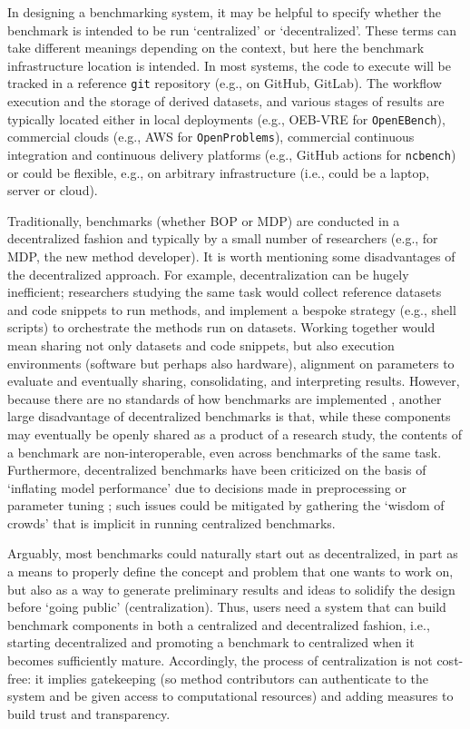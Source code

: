 \documentclass[11pt]{article}
\begin{document}
In designing a benchmarking system, it may be helpful to specify whether the benchmark is intended to be run `centralized' or `decentralized'. These terms can take different meanings depending on the context, but here the benchmark infrastructure location is intended. In most systems, the code to execute will be tracked in a reference \texttt{git} repository (e.g., on GitHub, GitLab). The workflow execution and the storage of derived datasets, and various stages of results are typically located either in local deployments (e.g., OEB-VRE for \texttt{OpenEBench}), commercial clouds (e.g., AWS for \texttt{OpenProblems}), commercial continuous integration and continuous delivery platforms (e.g., GitHub actions for \texttt{ncbench}) or could be flexible, e.g., on arbitrary infrastructure (i.e., could be a laptop, server or cloud). 

Traditionally, benchmarks (whether BOP or MDP) are conducted in a decentralized fashion and typically by a small number of researchers (e.g., for MDP, the new method developer). It is worth mentioning some disadvantages of the decentralized approach. For example, decentralization can be hugely inefficient; researchers studying the same task would collect reference datasets and code snippets to run methods, and implement a bespoke strategy (e.g., shell scripts) to orchestrate the methods run on datasets. Working together would mean sharing not only datasets and code snippets, but also execution environments (software but perhaps also hardware), alignment on parameters to evaluate and eventually sharing, consolidating, and interpreting results. However, because there are no standards of how benchmarks are implemented \cite{Sonrel2023-te}, another large disadvantage of decentralized benchmarks is that, while these components may eventually be openly shared as a product of a research study, the contents of a benchmark are non-interoperable, even across benchmarks of the same task. Furthermore, decentralized benchmarks have been criticized on the basis of `inflating model performance' due to decisions made in preprocessing or parameter tuning \cite{Luecken2024-fk}; such issues could be mitigated by gathering the `wisdom of crowds' that is implicit in running centralized benchmarks.

Arguably, most benchmarks could naturally start out as decentralized, in part as a means to properly define the concept and problem that one wants to work on, but also as a way to generate preliminary results and ideas to solidify the design before `going public' (centralization). Thus, users need a system that can build benchmark components in both a centralized and decentralized fashion, i.e., starting decentralized and promoting a benchmark to centralized when it becomes sufficiently mature. Accordingly, the process of centralization is not cost-free: it implies gatekeeping (so method contributors can authenticate to the system and be given access to computational resources) and adding measures to build trust and transparency.
\end{document}

